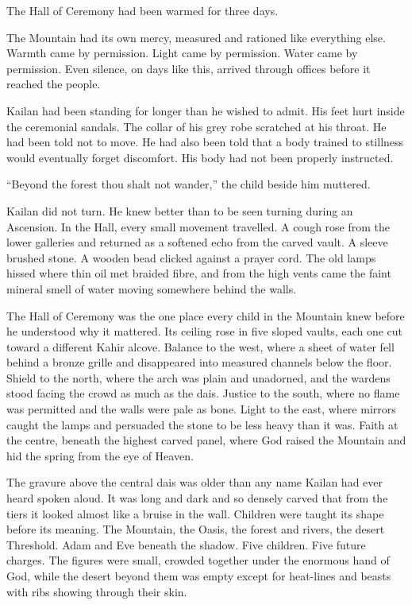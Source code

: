 
\noindent The Hall of Ceremony had been warmed for three days.\par

The Mountain had its own mercy, measured and rationed like everything else. Warmth came by permission. Light came by permission. Water came by permission. Even silence, on days like this, arrived through offices before it reached the people.\par

Kailan had been standing for longer than he wished to admit. His feet hurt inside the ceremonial sandals. The collar of his grey robe scratched at his throat. He had been told not to move. He had also been told that a body trained to stillness would eventually forget discomfort. His body had not been properly instructed.\par

“Beyond the forest thou shalt not wander,” the child beside him muttered.\par

Kailan did not turn. He knew better than to be seen turning during an Ascension. In the Hall, every small movement travelled. A cough rose from the lower galleries and returned as a softened echo from the carved vault. A sleeve brushed stone. A wooden bead clicked against a prayer cord. The old lamps hissed where thin oil met braided fibre, and from the high vents came the faint mineral smell of water moving somewhere behind the walls.\par

The Hall of Ceremony was the one place every child in the Mountain knew before he understood why it mattered. Its ceiling rose in five sloped vaults, each one cut toward a different Kahir alcove. Balance to the west, where a sheet of water fell behind a bronze grille and disappeared into measured channels below the floor. Shield to the north, where the arch was plain and unadorned, and the wardens stood facing the crowd as much as the dais. Justice to the south, where no flame was permitted and the walls were pale as bone. Light to the east, where mirrors caught the lamps and persuaded the stone to be less heavy than it was. Faith at the centre, beneath the highest carved panel, where God raised the Mountain and hid the spring from the eye of Heaven.\par

The gravure above the central dais was older than any name Kailan had ever heard spoken aloud. It was long and dark and so densely carved that from the tiers it looked almost like a bruise in the wall. Children were taught its shape before its meaning. The Mountain, the Oasis, the forest and rivers, the desert Threshold. Adam and Eve beneath the shadow. Five children. Five future charges. The figures were small, crowded together under the enormous hand of God, while the desert beyond them was empty except for heat-lines and beasts with ribs showing through their skin.\par

